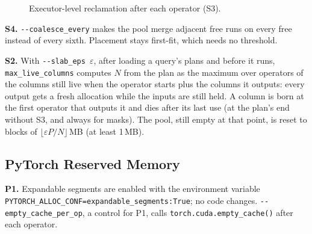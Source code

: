 \documentclass[10pt,twocolumn,letterpaper]{article}
\newcommand{\code}[1]{\texttt{\small #1}}
\begin{document}
\begin{figure}[t]
\centering
{}
\caption{Executor-level reclamation after each operator (S3).}
\label{fig:reclaim}
\end{figure}

\textbf{S4.} \code{-{}-coalesce\_every} makes the pool merge adjacent free runs on every
free instead of every sixth. Placement stays first-fit, which needs no threshold.

\textbf{S2.} With \code{-{}-slab\_eps}~$\varepsilon$, after loading a query's plans and
before it runs, \code{max\_live\_columns} computes $N$ from the plan as the maximum over
operators of the columns still live when the operator starts plus the columns it outputs:
every output gets a fresh allocation while the inputs are still held. A column is born at the
first operator that outputs it and dies after its last use (at the plan's end without S3, and
always for masks). The pool, still empty at that point, is reset to blocks of
$\lfloor \varepsilon P / N \rfloor$\,MB (at least 1\,MB).

\subsection{PyTorch Reserved Memory}
\textbf{P1.} Expandable segments are enabled with the environment variable
\code{PYTORCH\_ALLOC\_CONF=expandable\_segments:True}; no code changes.
\code{-{}-empty\_cache\_per\_op}, a control for P1, calls \code{torch.cuda.empty\_cache()} after each operator.
\end{document}
